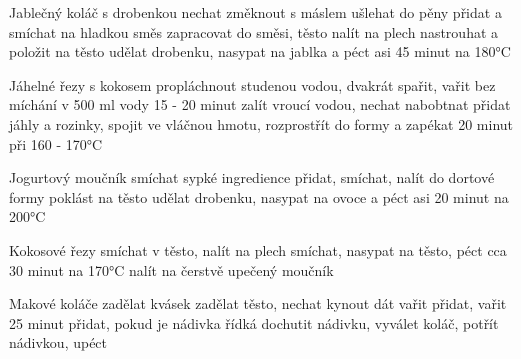 \documentclass[12pt,a4paper]{article}
\begin{document}
\begin{recipe}{Jablečný koláč s drobenkou}
   nechat změknout
   s máslem ušlehat do pěny
   přidat a smíchat na hladkou směs
   zapracovat do směsi, těsto nalít na plech
   nastrouhat a položit na těsto
   udělat drobenku, nasypat na jablka a péct asi 45 minut na 180°C
\end{recipe}
\newpage

\begin{recipe}{Jáhelné řezy s kokosem}
   propláchnout studenou vodou, dvakrát spařit, vařit bez míchání v 500 ml vody 15 - 20 minut
   zalít vroucí vodou, nechat nabobtnat
   přidat jáhly a rozinky, spojit ve vláčnou hmotu, rozprostřít do formy a zapékat 20 minut při 160 - 170°C
\end{recipe}
\newpage

\begin{recipe}{Jogurtový moučník}
   smíchat sypké ingredience
   přidat, smíchat, nalít do dortové formy
   poklást na těsto
   udělat drobenku, nasypat na ovoce a péct asi 20 minut na 200°C
\end{recipe}
\newpage

\begin{recipe}{Kokosové řezy}
   smíchat v těsto, nalít na plech
   smíchat, nasypat na těsto, péct cca 30 minut na 170°C
   nalít na čerstvě upečený moučník
\end{recipe}
\newpage

\begin{recipe}{Makové koláče}
   zadělat kvásek
   zadělat těsto, nechat kynout
   dát vařit
   přidat, vařit 25 minut
   přidat, pokud je nádivka řídká
   dochutit nádivku, vyválet koláč, potřít nádivkou, upéct
\end{recipe}
\newpage
\end{document}

